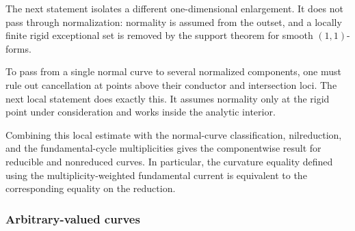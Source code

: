 The next statement isolates a different one-dimensional enlargement.  It
does not pass through normalization: normality is assumed from the outset,
and a locally finite rigid exceptional set is removed by the support theorem
for smooth $(1,1)$-forms.







To pass from a single normal curve to several normalized components, one
must rule out cancellation at points above their conductor and intersection
loci.  The next local statement does exactly this.  It assumes normality
only at the rigid point under consideration and works inside the analytic
interior.




Combining this local estimate with the normal-curve classification,
nilreduction, and the fundamental-cycle multiplicities gives the
componentwise result for reducible and nonreduced curves.  In particular,
the curvature equality defined using the multiplicity-weighted fundamental
current is equivalent to the corresponding equality on the reduction.






\subsubsection{Arbitrary-valued curves}
\label{sec:ch16-arbitrary-valued-curves}

